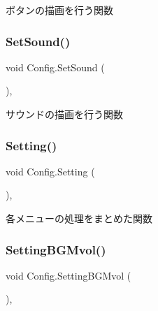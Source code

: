 ボタンの描画を行う関数 

\mbox{\label{class_config_a507cbfc344a6caf0d89dea1f0544861a}} 
\subsubsection{\texorpdfstring{Set\+Sound()}{SetSound()}}
{\footnotesize\ttfamily void Config.\+Set\+Sound (\begin{DoxyParamCaption}{ }\end{DoxyParamCaption})\hspace{0.3cm}{\ttfamily [inline]}, {\ttfamily [private]}}



サウンドの描画を行う関数 

\mbox{\label{class_config_ab74559087b49ddc68683cee83e60be25}} 
\subsubsection{\texorpdfstring{Setting()}{Setting()}}
{\footnotesize\ttfamily void Config.\+Setting (\begin{DoxyParamCaption}{ }\end{DoxyParamCaption})\hspace{0.3cm}{\ttfamily [inline]}, {\ttfamily [private]}}



各メニューの処理をまとめた関数 

\mbox{\label{class_config_a129efe0f7194ef8eb9c27a94752ff2b7}} 
\subsubsection{\texorpdfstring{Setting\+B\+G\+Mvol()}{SettingBGMvol()}}
{\footnotesize\ttfamily void Config.\+Setting\+B\+G\+Mvol (\begin{DoxyParamCaption}{ }\end{DoxyParamCaption})\hspace{0.3cm}{\ttfamily [inline]}, {\ttfamily [private]}}



